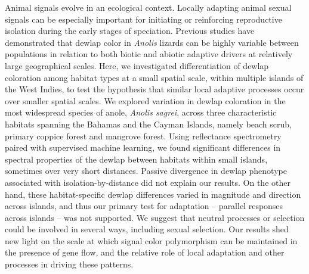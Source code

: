 Animal signals evolve in an ecological context. Locally adapting animal sexual signals can be especially important for initiating or reinforcing reproductive isolation during the early stages of speciation. Previous studies have demonstrated that dewlap color in \textit{Anolis} lizards can be highly variable between populations in relation to both biotic and abiotic adaptive drivers at relatively large geographical scales. Here, we investigated differentiation of dewlap coloration among habitat types at a small spatial scale, within multiple islands of the West Indies, to test the hypothesis that similar local adaptive processes occur over smaller spatial scales. We explored variation in dewlap coloration in the most widespread species of anole, \textit{Anolis sagrei}, across three characteristic habitats spanning the Bahamas and the Cayman Islands, namely beach scrub, primary coppice forest and mangrove forest. Using reflectance spectrometry paired with supervised machine learning, we found significant differences in spectral properties of the dewlap between habitats within small islands, sometimes over very short distances. Passive divergence in dewlap phenotype associated with isolation-by-distance did not explain our results. On the other hand, these habitat-specific dewlap differences varied in magnitude and direction across islands, and thus our primary test for adaptation -- parallel responses across islands -- was not supported. We suggest that neutral processes or selection could be involved in several ways, including sexual selection. Our results shed new light on the scale at which signal color polymorphism can be maintained in the presence of gene flow, and the relative role of local adaptation and other processes in driving these patterns.

